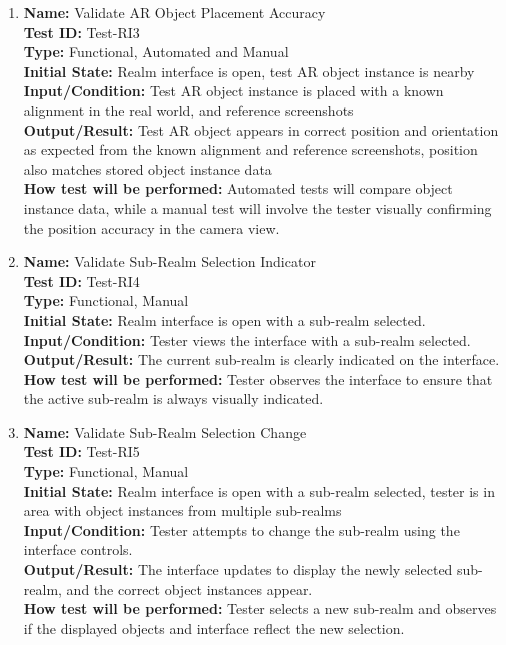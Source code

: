 \documentclass[12pt, titlepage]{article}
\begin{document}
\begin{enumerate}
  \item \textbf{Name:} Validate AR Object Placement Accuracy \label{itm:Test-RI3} \\
        \textbf{Test ID:} Test-RI3 \\
        \textbf{Type:} Functional, Automated and Manual \\
        \textbf{Initial State:} Realm interface is open, test AR object instance is nearby \\
        \textbf{Input/Condition:} Test AR object instance is placed with a known alignment in the real world, and reference screenshots \\
        \textbf{Output/Result:} Test AR object appears in correct position and orientation as expected from the known alignment and reference screenshots, position also matches stored object instance data \\
        \textbf{How test will be performed:} Automated tests will compare object instance data, while a manual test will involve the tester visually confirming the position accuracy in the camera view.


  \item \textbf{Name:} Validate Sub-Realm Selection Indicator \label{itm:Test-RI4} \\
        \textbf{Test ID:} Test-RI4 \\
        \textbf{Type:} Functional, Manual \\
        \textbf{Initial State:} Realm interface is open with a sub-realm selected. \\
        \textbf{Input/Condition:} Tester views the interface with a sub-realm selected. \\
        \textbf{Output/Result:} The current sub-realm is clearly indicated on the interface. \\
        \textbf{How test will be performed:} Tester observes the interface to ensure that the active sub-realm is always visually indicated.

  \item \textbf{Name:} Validate Sub-Realm Selection Change \label{itm:Test-RI5} \\
        \textbf{Test ID:} Test-RI5 \\
        \textbf{Type:} Functional, Manual \\
        \textbf{Initial State:} Realm interface is open with a sub-realm selected, tester is in area with object instances from multiple sub-realms \\
        \textbf{Input/Condition:} Tester attempts to change the sub-realm using the interface controls. \\
        \textbf{Output/Result:} The interface updates to display the newly selected sub-realm, and the correct object instances appear. \\ \textbf{How test will be performed:} Tester selects a new sub-realm and observes if the displayed objects and interface reflect the new selection.



\end{enumerate}
\end{document}
